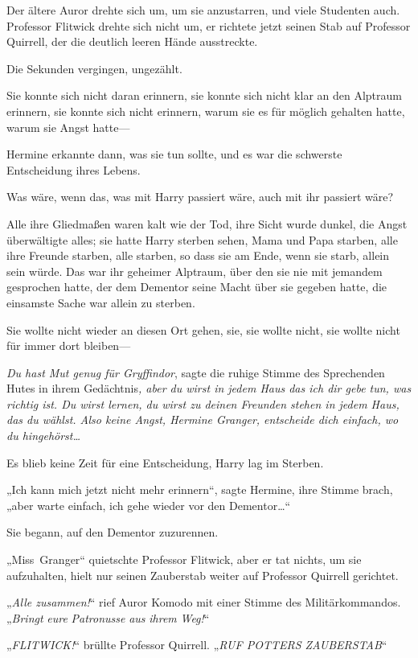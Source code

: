 Der ältere Auror drehte sich um, um sie anzustarren, und viele Studenten auch. Professor Flitwick drehte sich nicht um, er richtete jetzt seinen Stab auf Professor Quirrell, der die deutlich leeren Hände ausstreckte.

Die Sekunden vergingen, ungezählt.

Sie konnte sich nicht daran erinnern, sie konnte sich nicht klar an den Alptraum erinnern, sie konnte sich nicht erinnern, warum sie es für möglich gehalten hatte, warum sie Angst hatte—

Hermine erkannte dann, was sie tun sollte, und es war die schwerste Entscheidung ihres Lebens.

Was wäre, wenn das, was mit Harry passiert wäre, auch mit ihr passiert wäre?

Alle ihre Gliedmaßen waren kalt wie der Tod, ihre Sicht wurde dunkel, die Angst überwältigte alles; sie hatte Harry sterben sehen, Mama und Papa starben, alle ihre Freunde starben, alle starben, so dass sie am Ende, wenn sie starb, allein sein würde. Das war ihr geheimer Alptraum, über den sie nie mit jemandem gesprochen hatte, der dem Dementor seine Macht über sie gegeben hatte, die einsamste Sache war allein zu sterben.

Sie wollte nicht wieder an diesen Ort gehen, sie, sie wollte nicht, sie wollte nicht für immer dort bleiben—

\emph{Du hast Mut genug für Gryffindor}, sagte die ruhige Stimme des Sprechenden Hutes in ihrem Gedächtnis\emph{, aber du wirst in jedem Haus das ich dir gebe tun, was richtig ist. Du wirst lernen, du wirst zu deinen Freunden stehen in jedem Haus, das du wählst. Also keine Angst, Hermine Granger, entscheide dich einfach, wo du hingehörst…}

Es blieb keine Zeit für eine Entscheidung, Harry lag im Sterben.

„Ich kann mich jetzt nicht mehr erinnern“, sagte Hermine, ihre Stimme brach, „aber warte einfach, ich gehe wieder vor den Dementor…“

Sie begann, auf den Dementor zuzurennen.

„Miss~Granger“ quietschte Professor Flitwick, aber er tat nichts, um sie aufzuhalten, hielt nur seinen Zauberstab weiter auf Professor Quirrell gerichtet.

„\emph{Alle zusammen!}“ rief Auror Komodo mit einer Stimme des Militärkommandos. „\emph{Bringt} \emph{eure} \emph{Patronusse} \emph{aus} \emph{ihrem} \emph{Weg!}“

„\emph{FLITWICK!}“ brüllte Professor Quirrell. „\emph{RUF POTTERS ZAUBERSTAB}“

